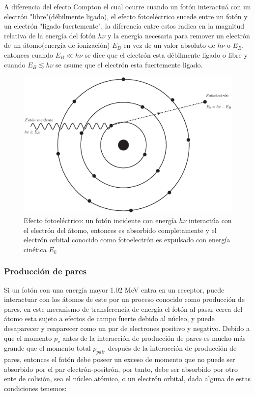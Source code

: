 A diferencia del efecto Compton el cual ocurre cuando un fotón interactuá con un electrón "libre"(débilmente ligado), el efecto fotoeléctrico sucede entre un fotón y un electrón "ligado fuertemente", la diferencia entre estos radica en la magnitud relativa de la energía del fotón $h\nu$ y la energía necesaria para remover un electrón de un átomo(energía de ionización) $E_B$ en vez de un valor absoluto de $h\nu$ o $E_B$, entonces cuando $E_B\ll h\nu$ se dice que el electrón esta débilmente ligado o libre y cuando  $E_B \lesssim h\nu$ se asume que el electrón esta fuertemente ligado\cite{Podgorsak}.


\begin{figure}[htbp]
    \centering
    \includegraphics[width=.68\linewidth]{./Figures/fotoelec.eps}
    \caption[Efecto fotoeléctrico]{Efecto fotoeléctrico: un fotón incidente con energía $h\nu$ interactúa con el electrón del átomo, entonces es absorbido completamente y el electrón orbital conocido como fotoelectrón es expulsado con energía cinética $E_k$}
    \label{fig:FT}
\end{figure}

\subsubsection{Producción de pares}
Si un fotón con una energía mayor  1.02 MeV entra en un receptor, puede interactuar con los átomos de este por un proceso conocido como producción de pares, en este mecanismo de transferencia de energía el fotón al pasar cerca del átomo esta sujeto a efectos de campo fuerte debido al núcleo, y puede desaparecer y reaparecer como un par de electrones positivo y negativo.\cite{Edward}
Debido a que el momento $p_\nu$ antes de la interacción de producción de pares es mucho más grande que el momento total  $p_{pair}$ después de la interacción de producción de pares,  entonces el fotón debe poseer un exceso de momento que no puede ser absorbido por el par electrón-positrón, por tanto, debe ser absorbido por otro ente de colisión, sea el núcleo atómico, o un electrón orbital\cite{Podgorsak}, dada alguna de estas condiciones tenemos:

